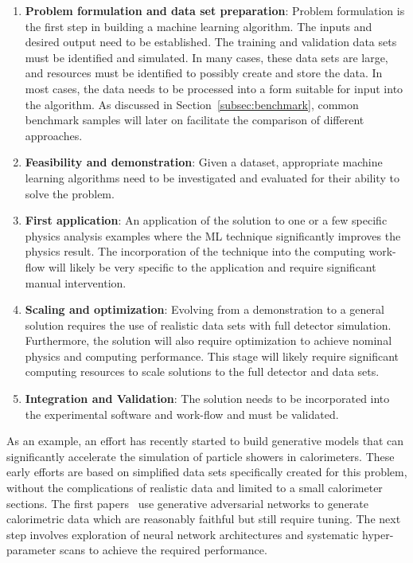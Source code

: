\begin{enumerate}
 \item \textbf{Problem formulation and data set preparation}: Problem formulation is the first step in building a machine learning algorithm. The inputs and desired output need to be established. The training and validation data sets must be identified and simulated. In many cases, these data sets are large, and resources must be identified to possibly create and store the data. In most cases, the data needs to be processed into a form suitable for input into the algorithm. As discussed in Section~\ref{subsec:benchmark}, common benchmark samples will later on facilitate the comparison of different approaches.
 \item \textbf{Feasibility and demonstration}: Given a dataset, appropriate machine learning algorithms need to be investigated and evaluated for their ability to solve the problem.
 \item \textbf{First application}: An application of the solution to one or a few specific physics analysis examples where the ML technique significantly improves the physics result. The incorporation of the technique into the computing work-flow will likely be very specific to the application and require significant manual intervention.
 \item \textbf{Scaling and optimization}: Evolving from a demonstration to a general solution requires the use of realistic data sets with full detector simulation. Furthermore, the solution will also require optimization to achieve nominal physics and computing performance. This stage will likely require significant computing resources to scale solutions to the full detector and data sets.
 \item \textbf{Integration and Validation}: The solution needs to be incorporated into the experimental software and work-flow and must be validated.
\end{enumerate}

As an example, an effort has recently started to build generative models that can significantly accelerate the simulation of particle showers in calorimeters.
These early efforts are based on simplified data sets specifically created for this problem, without the complications of realistic data and limited to a small calorimeter sections.
The first papers~\cite{Paganini:2017hrr} use generative adversarial networks to generate calorimetric data which are reasonably faithful but still require tuning. The next step involves exploration of neural network architectures and systematic hyper-parameter scans to achieve the required performance.


